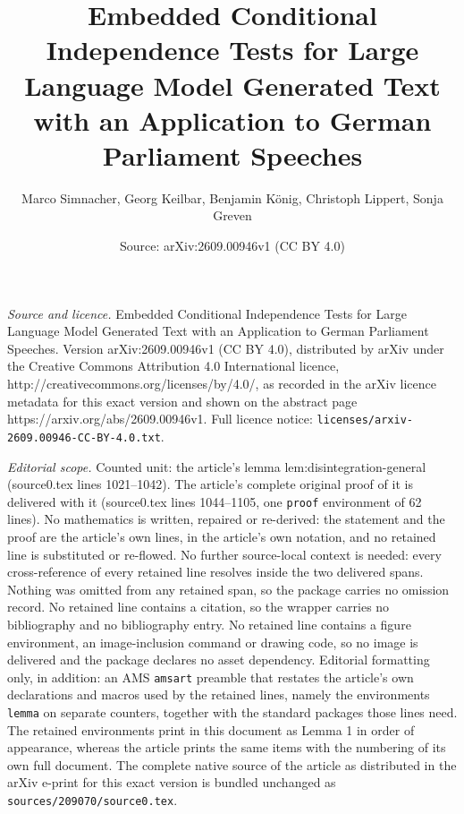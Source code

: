 \documentclass[10pt,a4paper]{amsart}
\title{Embedded Conditional Independence Tests for Large Language Model Generated Text with an Application to German Parliament Speeches}
\author{Marco Simnacher, Georg Keilbar, Benjamin K\"onig, Christoph Lippert, Sonja Greven}
\date{Source: arXiv:2609.00946v1 (CC BY 4.0)}
\begin{document}
\maketitle

\noindent\emph{Source and licence.} Embedded Conditional Independence Tests for Large Language Model Generated Text with an Application to German Parliament Speeches. Version arXiv:2609.00946v1 (CC BY 4.0), distributed by arXiv under the Creative Commons Attribution 4.0 International licence, http://creativecommons.org/licenses/by/4.0/, as recorded in the arXiv licence metadata for this exact version and shown on the abstract page https://arxiv.org/abs/2609.00946v1. Full licence notice: \texttt{licenses/arxiv-2609.00946-CC-BY-4.0.txt}.\par\smallskip

\noindent\textit{Editorial scope.} Counted unit: the article's lemma lem:disintegration-general (source0.tex lines 1021--1042). The article's complete original proof of it is delivered with it (source0.tex lines 1044--1105, one \texttt{proof} environment of 62 lines). No mathematics is written, repaired or re-derived: the statement and the proof are the article's own lines, in the article's own notation, and no retained line is substituted or re-flowed.  No further source-local context is needed: every cross-reference of every retained line resolves inside the two delivered spans.  Nothing was omitted from any retained span, so the package carries no omission record.  No retained line contains a citation, so the wrapper carries no bibliography and no bibliography entry.  No retained line contains a figure environment, an image-inclusion command or drawing code, so no image is delivered and the package declares no asset dependency.  Editorial formatting only, in addition: an AMS \texttt{amsart} preamble that restates the article's own declarations and macros used by the retained lines, namely the environments \texttt{lemma} on separate counters, together with the standard packages those lines need.  The retained environments print in this document as Lemma 1 in order of appearance, whereas the article prints the same items with the numbering of its own full document.  The complete native source of the article as distributed in the arXiv e-print for this exact version is bundled unchanged as \texttt{sources/209070/source0.tex}.
\end{document}
